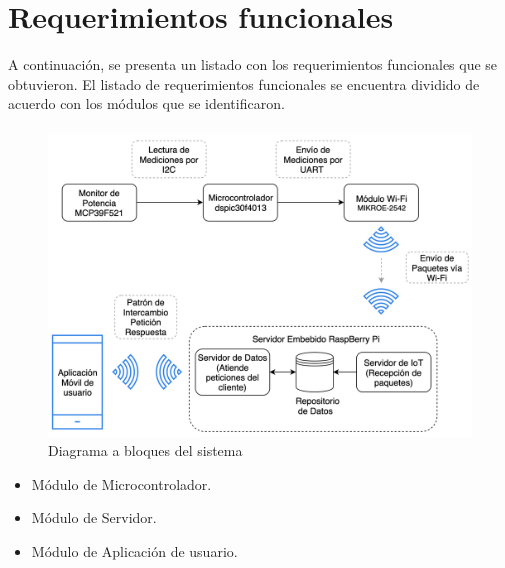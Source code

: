 \section{Requerimientos funcionales}
A continuación, se presenta un listado con los requerimientos funcionales que se obtuvieron.
El listado de requerimientos funcionales se encuentra dividido de acuerdo con los módulos que se identificaron.

\paragraph{}
\begin{figure}[H]
	\centering
	\includegraphics[scale=.5]{Capitulo3/img/diagramabloques.png}
	\caption{Diagrama a bloques del sistema}
	\label{fig:diagrama_dispMonitoreo}
\end{figure}

\begin{itemize}
	\item Módulo de Microcontrolador.
	\item Módulo de Servidor.
	\item Módulo de Aplicación de usuario.
\end{itemize}

